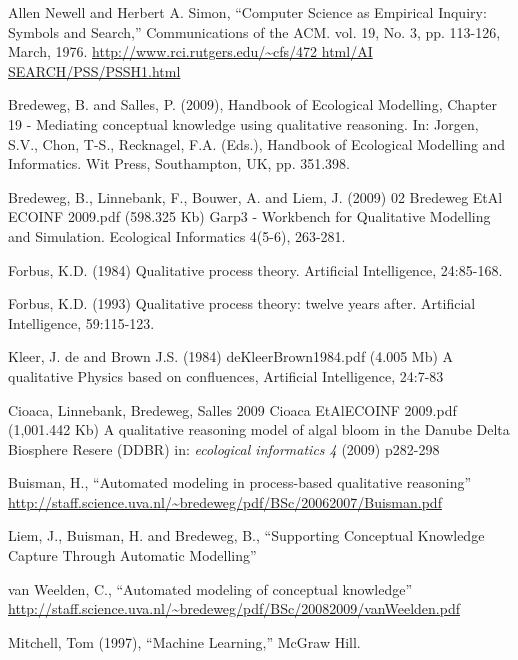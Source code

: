 \documentclass{article} %
\begin{document}
\begin{thebibliography}{99}

 Allen Newell and Herbert A. Simon, ``Computer Science as
Empirical Inquiry: Symbols and Search,'' Communications of the ACM. vol. 19,
No. 3, pp. 113-126, March, 1976. \url{http://www.rci.rutgers.edu/~cfs/472
html/AI SEARCH/PSS/PSSH1.html}

 Bredeweg, B. and Salles, P. (2009), Handbook of
Ecological Modelling, Chapter 19 - Mediating conceptual knowledge using
qualitative reasoning. In: J\/orgen, S.V., Chon, T-S., Recknagel, F.A. (Eds.),
Handbook of Ecological Modelling and Informatics. Wit Press, Southampton, UK,
pp. 351.398.

 Bredeweg, B., Linnebank, F., Bouwer, A. and Liem, J.
(2009) 02 Bredeweg EtAl ECOINF 2009.pdf (598.325 Kb) Garp3 - Workbench for
Qualitative Modelling and Simulation. Ecological Informatics 4(5-6), 263-281.

 Forbus, K.D. (1984) Qualitative process theory. Artificial 
Intelligence, 24:85-168. 

 Forbus, K.D. (1993) Qualitative process theory: twelve years
after. Artificial Intelligence, 59:115-123. 

 Kleer, J. de and Brown J.S. (1984) deKleerBrown1984.pdf (4.005
Mb) A qualitative Physics based on confluences, Artificial Intelligence,
24:7-83 %

 Cioaca, Linnebank, Bredeweg, Salles 2009 Cioaca EtAlECOINF
2009.pdf (1,001.442 Kb) A qualitative reasoning model of algal bloom in the
Danube Delta Biosphere Resere (DDBR) in: \emph{ecological informatics 4} (2009)
p282-298

 Buisman, H., ``Automated modeling in process-based
qualitative reasoning''
\url{http://staff.science.uva.nl/~bredeweg/pdf/BSc/20062007/Buisman.pdf}

 Liem, J., Buisman, H. and Bredeweg, B., ``Supporting
Conceptual Knowledge Capture Through Automatic Modelling''

 van Weelden, C., ``Automated modeling of conceptual
knowledge'' \url{http://staff.science.uva.nl/~bredeweg/pdf/BSc/20082009/vanWeelden.pdf}

	Mitchell, Tom (1997), ``Machine Learning,'' McGraw Hill.


\end{thebibliography}
\end{document}
